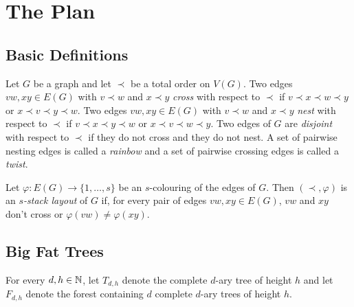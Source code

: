 \documentclass[kpfonts]{patmorin}
\begin{document}
\section{The Plan}

\subsection{Basic Definitions}
Let $G$ be a graph and let $\prec$ be a total order on $V(G)$.  Two edges $vw,xy\in E(G)$ with $v\prec w$ and $x\prec y$ \emph{cross} with respect to $\prec$ if $v\prec x\prec w\prec y$ or $x\prec v\prec y\prec w$. Two edges $vw,xy\in E(G)$ with $v\prec w$ and $x\prec y$ \emph{nest} with respect to $\prec$ if $v\prec x\prec y\prec w$ or $x\prec v\prec w\prec y$.  Two edges of $G$ are \emph{disjoint} with respect to $\prec$ if they do not cross and they do not nest. A set of pairwise nesting edges is called a \emph{rainbow} and a set of pairwise crossing edges is called a \emph{twist}.

Let $\varphi:E(G)\to\{1,\ldots,s\}$ be an $s$-colouring of the edges of $G$.  Then $(\prec,\varphi)$ is an \emph{$s$-stack layout} of $G$ if, for every pair of edges $vw,xy\in E(G)$, $vw$ and $xy$ don't cross or $\varphi(vw)\neq\varphi(xy)$.


\subsection{Big Fat Trees}

For every $d,h\in\mathbb{N}$, let $T_{d,h}$ denote the complete $d$-ary tree of height $h$ and let $F_{d,h}$ denote the forest containing $d$ complete $d$-ary trees of height $h$.

% 
% 
% 
% 
% 
% 
% 
% 
% 
% 
% 
\end{document}
